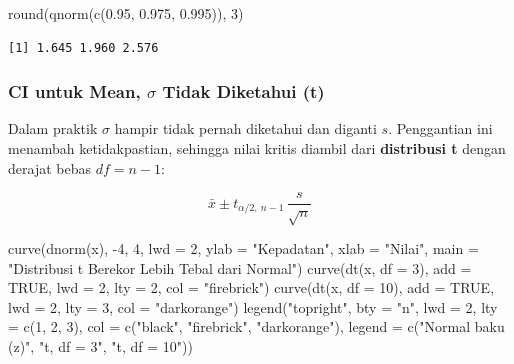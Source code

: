 \documentclass[
  indonesian,
  letterpaper,
]{book}
\newenvironment{Shaded}{\begin{snugshade}}{\end{snugshade}}
\newcommand{\AttributeTok}[1]{\textcolor[rgb]{0.40,0.45,0.13}{#1}}
\newcommand{\ConstantTok}[1]{\textcolor[rgb]{0.56,0.35,0.01}{#1}}
\newcommand{\DecValTok}[1]{\textcolor[rgb]{0.68,0.00,0.00}{#1}}
\newcommand{\FloatTok}[1]{\textcolor[rgb]{0.68,0.00,0.00}{#1}}
\newcommand{\FunctionTok}[1]{\textcolor[rgb]{0.28,0.35,0.67}{#1}}
\newcommand{\NormalTok}[1]{\textcolor[rgb]{0.00,0.23,0.31}{#1}}
\newcommand{\SpecialCharTok}[1]{\textcolor[rgb]{0.37,0.37,0.37}{#1}}
\newcommand{\StringTok}[1]{\textcolor[rgb]{0.13,0.47,0.30}{#1}}
\begin{document}
\begin{Shaded}
\begin{Highlighting}[]
\FunctionTok{round}\NormalTok{(}\FunctionTok{qnorm}\NormalTok{(}\FunctionTok{c}\NormalTok{(}\FloatTok{0.95}\NormalTok{, }\FloatTok{0.975}\NormalTok{, }\FloatTok{0.995}\NormalTok{)), }\DecValTok{3}\NormalTok{)}
\end{Highlighting}
\end{Shaded}

\begin{verbatim}
[1] 1.645 1.960 2.576
\end{verbatim}

\subsubsection{\texorpdfstring{CI untuk Mean, \(\sigma\) Tidak Diketahui
(t)}{CI untuk Mean, \textbackslash sigma Tidak Diketahui (t)}}\label{ci-untuk-mean-sigma-tidak-diketahui-t}

Dalam praktik \(\sigma\) hampir tidak pernah diketahui dan diganti
\(s\). Penggantian ini menambah ketidakpastian, sehingga nilai kritis
diambil dari \textbf{distribusi t} dengan derajat bebas \(df = n - 1\):

\[
\bar{x} \pm t_{\alpha/2,\ n-1}\,\frac{s}{\sqrt{n}}
\]

\begin{Shaded}
\begin{Highlighting}[]
\FunctionTok{curve}\NormalTok{(}\FunctionTok{dnorm}\NormalTok{(x), }\SpecialCharTok{{-}}\DecValTok{4}\NormalTok{, }\DecValTok{4}\NormalTok{, }\AttributeTok{lwd =} \DecValTok{2}\NormalTok{, }\AttributeTok{ylab =} \StringTok{"Kepadatan"}\NormalTok{, }\AttributeTok{xlab =} \StringTok{"Nilai"}\NormalTok{,}
      \AttributeTok{main =} \StringTok{"Distribusi t Berekor Lebih Tebal dari Normal"}\NormalTok{)}
\FunctionTok{curve}\NormalTok{(}\FunctionTok{dt}\NormalTok{(x, }\AttributeTok{df =} \DecValTok{3}\NormalTok{), }\AttributeTok{add =} \ConstantTok{TRUE}\NormalTok{, }\AttributeTok{lwd =} \DecValTok{2}\NormalTok{, }\AttributeTok{lty =} \DecValTok{2}\NormalTok{, }\AttributeTok{col =} \StringTok{"firebrick"}\NormalTok{)}
\FunctionTok{curve}\NormalTok{(}\FunctionTok{dt}\NormalTok{(x, }\AttributeTok{df =} \DecValTok{10}\NormalTok{), }\AttributeTok{add =} \ConstantTok{TRUE}\NormalTok{, }\AttributeTok{lwd =} \DecValTok{2}\NormalTok{, }\AttributeTok{lty =} \DecValTok{3}\NormalTok{, }\AttributeTok{col =} \StringTok{"darkorange"}\NormalTok{)}
\FunctionTok{legend}\NormalTok{(}\StringTok{"topright"}\NormalTok{, }\AttributeTok{bty =} \StringTok{"n"}\NormalTok{, }\AttributeTok{lwd =} \DecValTok{2}\NormalTok{, }\AttributeTok{lty =} \FunctionTok{c}\NormalTok{(}\DecValTok{1}\NormalTok{, }\DecValTok{2}\NormalTok{, }\DecValTok{3}\NormalTok{), }\AttributeTok{col =} \FunctionTok{c}\NormalTok{(}\StringTok{"black"}\NormalTok{, }\StringTok{"firebrick"}\NormalTok{, }\StringTok{"darkorange"}\NormalTok{),}
       \AttributeTok{legend =} \FunctionTok{c}\NormalTok{(}\StringTok{"Normal baku (z)"}\NormalTok{, }\StringTok{"t, df = 3"}\NormalTok{, }\StringTok{"t, df = 10"}\NormalTok{))}
\end{Highlighting}
\end{Shaded}
\end{document}
